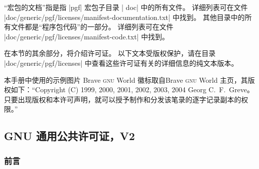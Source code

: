 
``宏包的文档''指是指 |pgf| 宏包子目录 | doc| 中的所有文件。 详细列表可在文件 |doc/generic/pgf/licenses/manifest-documentation.txt| 中找到。 其他目录中的所有文件都是``程序包代码''的一部分。 详细列表可在文件 |doc/generic/pgf/licenses/manifest-code.txt| 中找到。


在本节的其余部分，将介绍许可证。 以下文本受版权保护，请在目录 |doc/generic/pgf/licenses| 中查看这些许可证有关的详细信息的纯文本版本。 


本手册中使用的示例图片 B​​rave \textsc{gnu} World 徽标取自Brave \textsc{gnu} World 主页，其版权如下：``Copyright (C) 1999, 2000, 2001, 2002, 2003, 2004 Georg C.~F.\ Greve。 只要出现版权和本许可声明，就可以授予制作和分发该笔录的逐字记录副本的权限。''


\subsection{GNU 通用公共许可证，V2}

\subsubsection{前言}

